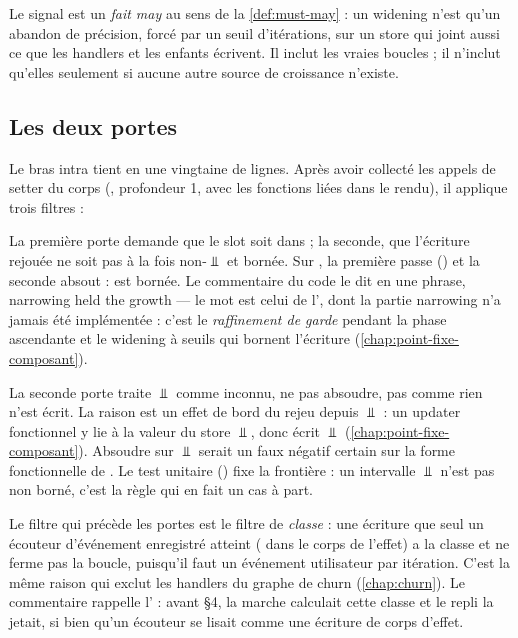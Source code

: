 Le signal est un \emph{fait may} au sens de la \cref{def:must-may} : un widening n'est qu'un abandon de précision, forcé par un seuil d'itérations, sur un store qui joint aussi ce que les handlers et les enfants écrivent. Il inclut les vraies boucles ; il n'inclut qu'elles seulement si aucune autre source de croissance n'existe.

\subsection{Les deux portes}

Le bras intra tient en une vingtaine de lignes. Après avoir collecté les appels de setter du corps (, profondeur 1, avec les fonctions liées dans le rendu), il applique trois filtres :


La première porte demande que le slot soit dans  ; la seconde, que l'écriture rejouée ne soit pas à la fois non-$\Bot$ et bornée. Sur , la première passe () et la seconde absout : \code{[1,10]} est bornée. Le commentaire du code le dit en une phrase, \og narrowing held the growth\fg{} --- le mot est celui de l', dont la partie narrowing n'a jamais été implémentée : c'est le \emph{raffinement de garde} pendant la phase ascendante et le widening à seuils qui bornent l'écriture (\cref{chap:point-fixe-composant}).

\begin{piege}
La seconde porte traite $\Bot$ comme \og inconnu, ne pas absoudre\fg{}, pas comme \og rien n'est écrit\fg. La raison est un effet de bord du rejeu depuis $\Bot$ : un updater fonctionnel  y lie  à la valeur du store $\Bot$, donc écrit $\Bot$ (\cref{chap:point-fixe-composant}). Absoudre sur $\Bot$ serait un faux négatif certain sur la forme fonctionnelle de . Le test unitaire  () fixe la frontière : un intervalle $\Bot$ n'est pas \og non borné\fg{}, c'est la règle qui en fait un cas à part.
\end{piege}

Le filtre qui précède les portes est le filtre de \emph{classe} : une écriture que seul un écouteur d'événement enregistré atteint ( dans le corps de l'effet) a la classe  et ne ferme pas la boucle, puisqu'il faut un événement utilisateur par itération. C'est la même raison qui exclut les handlers du graphe de churn (\cref{chap:churn}). Le commentaire rappelle l' : avant  §4, la marche calculait cette classe et le repli la jetait, si bien qu'un écouteur  se lisait comme une écriture de corps d'effet.

